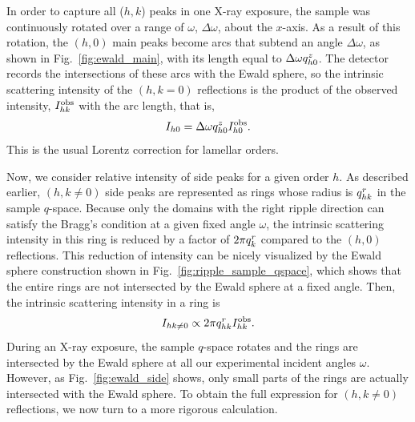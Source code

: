 In order to capture all ($h,k$) peaks in one X-ray exposure, 
the sample was continuously rotated over a range of $\omega$, $\Delta\omega$,
about the $x$-axis. As a result of this rotation, 
the $(h,0)$ main peaks become arcs that subtend an angle $\Delta\omega$,
as shown in Fig.~\ref{fig:ewald_main}, with its length
equal to $\Delta\omega q_{h0}^z$. 
The detector records the intersections of these arcs with the 
Ewald sphere, so the intrinsic scattering intensity of the $(h,k=0)$ reflections
is the product of the observed intensity, $I_{hk}^\textrm{obs}$ with the arc length, that is, 
\begin{equation}
  I_{h0} = \Delta\omega q_{h0}^z I_{h0}^\textrm{obs}. \label{eq:main_ewald}
\end{equation}
This is the usual Lorentz correction for lamellar orders.

Now, we consider relative intensity of side peaks for a given order $h$.
As described earlier, $(h,k\neq 0)$ side peaks are represented as
rings whose radius is $q_{hk}^r$ in the sample $q$-space. 
Because only the domains with the right ripple direction can satisfy the Bragg's condition at a given fixed
angle $\omega$, the intrinsic scattering intensity in this ring is reduced by 
a factor of $2\pi q_{k}^r$ compared to the $(h,0)$ reflections.
This reduction of intensity can be nicely visualized by the Ewald sphere construction
shown in Fig.~\ref{fig:ripple_sample_qspace},
which shows that the entire rings are not intersected by the Ewald sphere at 
a fixed angle. Then, the intrinsic scattering intensity in a ring is
\begin{equation}
  I_{hk\neq 0} \propto 2\pi q_{hk}^r I_{hk}^\textrm{obs}. \label{eq:side_ewald}
\end{equation}
During an X-ray exposure, the sample $q$-space rotates and 
the rings are intersected by the Ewald sphere at all our experimental incident angles $\omega$.
However, as Fig.~\ref{fig:ewald_side} shows, only small parts of the rings
are actually intersected with the Ewald sphere.  
To obtain the full expression for $(h,k\neq 0)$ reflections, we now turn
to a more rigorous calculation.


